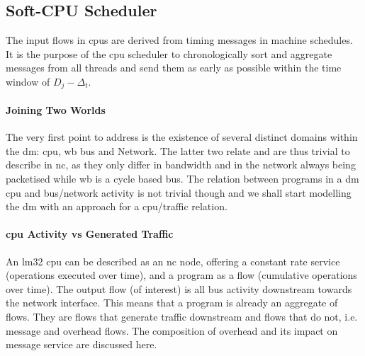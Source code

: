 \subsection{Soft-CPU Scheduler}
The input flows in \gls{cpu}s are derived from timing messages in machine schedules. It is the purpose of the \gls{cpu} scheduler to chronologically sort
and aggregate messages from all threads and send them as early as possible within the time window of $D_j - \Delta_t$.

\paragraph{Joining Two Worlds}
The very first point to address is the existence of several distinct domains within the \gls{dm}: \gls{cpu}, \gls{wb} bus and Network. 
The latter two relate and are thus trivial to describe in \gls{nc}, as they only differ in bandwidth and in the network always being packetised while \gls{wb} is a cycle based bus.
The relation between programs in a \gls{dm} \gls{cpu} and bus/network activity is not trivial though and
we shall start modelling the \gls{dm} with an approach for a \gls{cpu}/traffic relation.
\paragraph{\gls{cpu} Activity vs Generated Traffic}
An \gls{lm32} \gls{cpu} can be described as an \gls{nc} node, offering a constant rate service (operations executed over time), and a program as a flow (cumulative operations over time).
The output flow (of interest) is all bus activity downstream towards the network interface. This means that a program is already an aggregate of flows. They are flows that generate traffic downstream and flows
that do not, i.e. message and overhead flows. The composition of overhead and its impact on message service are discussed here.

